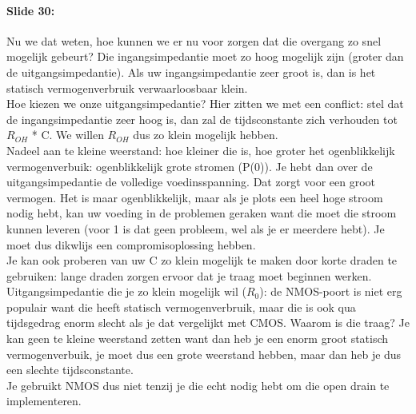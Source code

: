 \documentclass[10pt,a4paper]{book}
\begin{document}
\paragraph{Slide 30:}  Nu we dat weten, hoe kunnen we er nu voor zorgen dat die overgang zo snel mogelijk gebeurt? Die ingangsimpedantie moet zo hoog mogelijk zijn (groter dan de uitgangsimpedantie). Als uw ingangsimpedantie zeer groot is, dan is het statisch vermogenverbruik verwaarloosbaar klein. \\
Hoe kiezen we onze uitgangsimpedantie? Hier zitten we met een conflict: stel dat de ingangsimpedantie zeer hoog is, dan zal de tijdsconstante zich verhouden tot $R_{OH}$ * C. We willen $R_{OH}$ dus zo klein mogelijk hebben. \\
Nadeel aan te kleine weerstand: hoe kleiner die is, hoe groter het ogenblikkelijk vermogenverbuik: ogenblikkelijk grote stromen (P(0)). Je hebt dan over de uitgangsimpedantie de volledige voedinsspanning. Dat zorgt voor een groot vermogen. Het is maar ogenblikkelijk, maar als je plots een heel hoge stroom nodig hebt, kan uw voeding in de problemen geraken want die moet die stroom kunnen leveren (voor 1 is dat geen probleem, wel als je er meerdere hebt). Je moet dus dikwlijs een compromisoplossing hebben.\\
Je kan ook proberen van uw C zo klein mogelijk te maken door korte draden te gebruiken: lange draden zorgen ervoor dat je traag moet beginnen werken. \\
Uitgangsimpedantie die je zo klein mogelijk wil ($R_0$): de NMOS-poort is niet erg populair want die heeft statisch vermogenverbruik, maar die is ook qua tijdsgedrag enorm slecht als je dat vergelijkt met CMOS. Waarom is die traag? Je kan geen te kleine weerstand zetten want dan heb je een enorm groot statisch vermogenverbuik, je moet dus een grote weerstand hebben, maar dan heb je dus een slechte tijdsconstante.\\
Je gebruikt NMOS dus niet tenzij je die echt nodig hebt om die open drain te implementeren.
\end{document}
